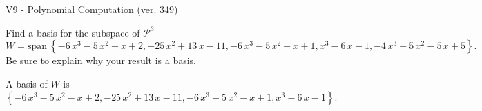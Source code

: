 \begin{exercise}
  \begin{exerciseTitle}V9 - Polynomial Computation (ver. 349)\end{exerciseTitle}
  \begin{exerciseStatement}
    Find a basis for the subspace of \(\mathcal{P}^3\) 
\[W=\mathrm{span}\ \left\{-6 \, x^{3} - 5 \, x^{2} - x + 2 , -25 \, x^{2} + 13 \, x - 11 , -6 \, x^{3} - 5 \, x^{2} - x + 1 , x^{3} - 6 \, x - 1 , -4 \, x^{3} + 5 \, x^{2} - 5 \, x + 5\right\}.\]
 Be sure to explain why your result is a basis.


  \end{exerciseStatement}
  \begin{exerciseAnswer}
   A basis of \(W\) is  \(\left\{-6 \, x^{3} - 5 \, x^{2} - x + 2 , -25 \, x^{2} + 13 \, x - 11 , -6 \, x^{3} - 5 \, x^{2} - x + 1 , x^{3} - 6 \, x - 1\right\}\).
  


  \end{exerciseAnswer}
\end{exercise}
